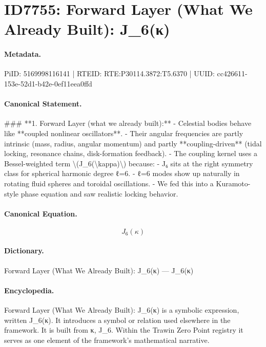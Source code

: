 \section*{ID7755: Forward Layer (What We Already Built): J\_6(κ)}
\paragraph{Metadata.}
PiID: 5169998116141 | RTEID: RTE:P30114.3872:T5.6370 | UUID: cc426611-153e-52d1-b42e-0ef11eea0ffd

\paragraph{Canonical Statement.}
\#\#\# **1. Forward Layer (what we already built):** - Celestial bodies behave like **coupled nonlinear oscillators**. - Their angular frequencies are partly intrinsic (mass, radius, angular momentum) and partly **coupling-driven** (tidal locking, resonance chains, disk-formation feedback). - The coupling kernel uses a Bessel-weighted term \textbackslash{}(J\_6(\textbackslash{}kappa)\textbackslash{}) because: - J₆ sits at the right symmetry class for spherical harmonic degree ℓ=6. - ℓ=6 modes show up naturally in rotating fluid spheres and toroidal oscillations. - We fed this into a Kuramoto-style phase equation and saw realistic locking behavior.

\paragraph{Canonical Equation.}
\[
J_6(\kappa)
\]

\paragraph{Dictionary.}
Forward Layer (What We Already Built): J\_6(κ) — J\_6(κ)

\paragraph{Encyclopedia.}
Forward Layer (What We Already Built): J\_6(κ) is a symbolic expression, written J\_6(κ). It introduces a symbol or relation used elsewhere in the framework. It is built from κ, J\_6. Within the Trawin Zero Point registry it serves as one element of the framework's mathematical narrative.
